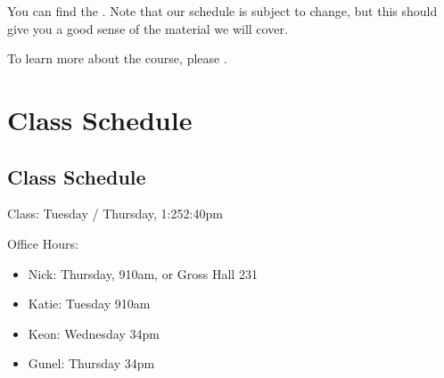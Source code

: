 \documentclass[letterpaper,10pt,english]{jupyterBook}
\begin{document}
\sphinxAtStartPar
You can find the {\hyperref[\detokenize{00_class_schedule/class_schedule::doc}]{}}. Note that our schedule is subject to change, but this should give you a good sense of the material we will cover.

\begin{DUlineblock}{0em}
\item[] 
\end{DUlineblock}

\sphinxAtStartPar
To learn more about the course, please .

\sphinxstepscope


\part{Class Schedule}

\sphinxstepscope


\chapter{Class Schedule}
\label{\detokenize{00_class_schedule/class_schedule:class-schedule}}\label{\detokenize{00_class_schedule/class_schedule::doc}}
\sphinxAtStartPar
Class: Tuesday / Thursday, 1:25\sphinxhyphen{}2:40pm

\sphinxAtStartPar
Office Hours:
\begin{itemize}
\item {} 
\sphinxAtStartPar
Nick: Thursday, 9\sphinxhyphen{}10am,  or Gross Hall 231

\item {} 
\sphinxAtStartPar
Katie: Tuesday 9\sphinxhyphen{}10am

\item {} 
\sphinxAtStartPar
Keon: Wednesday 3\sphinxhyphen{}4pm

\item {} 
\sphinxAtStartPar
Gunel: Thursday 3\sphinxhyphen{}4pm

\end{itemize}
\end{document}
